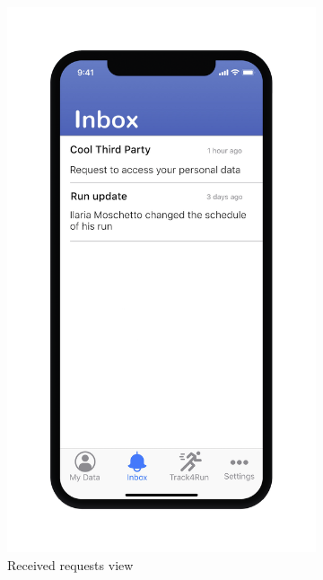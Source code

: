 \begin{figure}[H]
\centering
\begin{subfigure}{.5\textwidth}
  \centering
  \includegraphics[width=.8\textwidth]{./Pictures/Mockup/mobile/inbox.png}
  \captionsetup{skip=0pt}
  \caption{Received requests view}
  \label{ffig:mobile-inbox}
\end{subfigure}%
\begin{subfigure}{.5\textwidth}
  \centering

\end{subfigure}
\end{figure}
